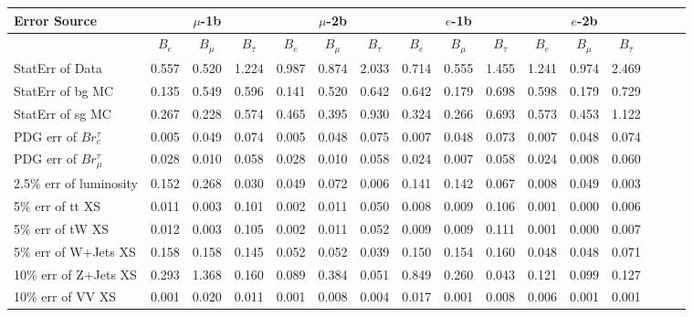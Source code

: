 \begin{sidewaystable}[p]
  \small
  \renewcommand{\arraystretch}{1.2}
  \centering

  \begin{tabular}{|l|ccc|ccc|ccc|ccc|ccc|}
  \hline
  Error Source & \multicolumn{3}{c|}{$\mu$-1b} & \multicolumn{3}{c|}{$\mu$-2b} & \multicolumn{3}{c|}{$e$-1b} & \multicolumn{3}{c|}{$e$-2b} \\
  \hline
                & $B_e$ & $B_\mu$ & $B_\tau$ & $B_e$ & $B_\mu$ & $B_\tau$ & $B_e$ & $B_\mu$ & $B_\tau$ & $B_e$ & $B_\mu$ & $B_\tau$ \\
  \hline
  StatErr of Data                            & 0.557 & 0.520 & 1.224 & 0.987 & 0.874 & 2.033 & 0.714 & 0.555 & 1.455 & 1.241 & 0.974 & 2.469 \\ 
  StatErr of bg MC                           & 0.135 & 0.549 & 0.596 & 0.141 & 0.520 & 0.642 & 0.642 & 0.179 & 0.698 & 0.598 & 0.179 & 0.729 \\ 
  StatErr of sg MC                           & 0.267 & 0.228 & 0.574 & 0.465 & 0.395 & 0.930 & 0.324 & 0.266 & 0.693 & 0.573 & 0.453 & 1.122 \\ 
  \hline
  PDG err of $Br^\tau_e$                     & 0.005 & 0.049 & 0.074 & 0.005 & 0.048 & 0.075 & 0.007 & 0.048 & 0.073 & 0.007 & 0.048 & 0.074 \\ 
  PDG err of $Br^\tau_\mu$                   & 0.028 & 0.010 & 0.058 & 0.028 & 0.010 & 0.058 & 0.024 & 0.007 & 0.058 & 0.024 & 0.008 & 0.060 \\ 
  2.5$\%$ err of luminosity                  & 0.152 & 0.268 & 0.030 & 0.049 & 0.072 & 0.006 & 0.141 & 0.142 & 0.067 & 0.008 & 0.049 & 0.003 \\ 
  5$\%$ err of tt XS                         & 0.011 & 0.003 & 0.101 & 0.002 & 0.011 & 0.050 & 0.008 & 0.009 & 0.106 & 0.001 & 0.000 & 0.006 \\ 
  5$\%$ err of tW XS                         & 0.012 & 0.003 & 0.105 & 0.002 & 0.011 & 0.052 & 0.009 & 0.009 & 0.111 & 0.001 & 0.000 & 0.007 \\ 
  5$\%$ err of W+Jets XS                     & 0.158 & 0.158 & 0.145 & 0.052 & 0.052 & 0.039 & 0.150 & 0.154 & 0.160 & 0.048 & 0.048 & 0.071 \\ 
  10$\%$ err of Z+Jets XS                    & 0.293 & 1.368 & 0.160 & 0.089 & 0.384 & 0.051 & 0.849 & 0.260 & 0.043 & 0.121 & 0.099 & 0.127 \\ 
  10$\%$ err of VV XS                        & 0.001 & 0.020 & 0.011 & 0.001 & 0.008 & 0.004 & 0.017 & 0.001 & 0.008 & 0.006 & 0.001 & 0.001 \\ 

\end{tabular}
\end{sidewaystable}
